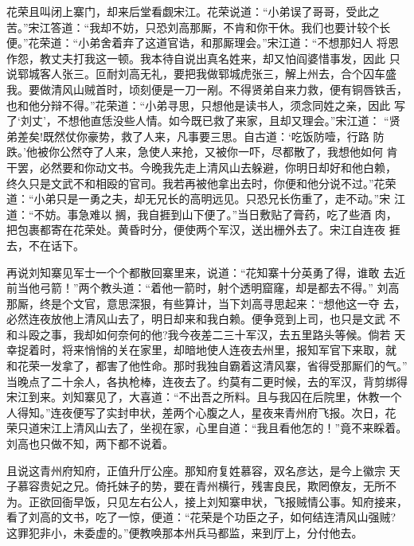 花荣且叫闭上寨门，却来后堂看觑宋江。花荣说道：“小弟误了哥哥，受此之
苦。”宋江答道：“我却不妨，只恐刘高那厮，不肯和你干休。我们也要计较个长
便。”花荣道：“小弟舍着弃了这道官诰，和那厮理会。”宋江道：“不想那妇人
将恩作怨，教丈夫打我这一顿。我本待自说出真名姓来，却又怕阎婆惜事发，因此
只说郓城客人张三。叵耐刘高无礼，要把我做郓城虎张三，解上州去，合个囚车盛
我。要做清风山贼首时，顷刻便是一刀一剐。不得贤弟自来力救，便有铜唇铁舌，
也和他分辩不得。”花荣道：“小弟寻思，只想他是读书人，须念同姓之亲，因此
写了‘刘丈’，不想他直恁没些人情。如今既已救了来家，且却又理会。”宋江道：
“贤弟差矣!既然仗你豪势，救了人来，凡事要三思。自古道：‘吃饭防噎，行路
防跌。’他被你公然夺了人来，急使人来抢，又被你一吓，尽都散了，我想他如何
肯干罢，必然要和你动文书。今晚我先走上清风山去躲避，你明日却好和他白赖，
终久只是文武不和相殴的官司。我若再被他拿出去时，你便和他分说不过。”花荣
道：“小弟只是一勇之夫，却无兄长的高明远见。只恐兄长伤重了，走不动。”宋
江道：“不妨。事急难以搁，我自捱到山下便了。”当日敷贴了膏药，吃了些酒
肉，把包裹都寄在花荣处。黄昏时分，便使两个军汉，送出栅外去了。宋江自连夜
捱去，不在话下。

再说刘知寨见军士一个个都散回寨里来，说道：“花知寨十分英勇了得，谁敢
去近前当他弓箭！”两个教头道：“着他一箭时，射个透明窟窿，却是都去不得。”
刘高那厮，终是个文官，意思深狠，有些算计，当下刘高寻思起来：“想他这一夺
去，必然连夜放他上清风山去了，明日却来和我白赖。便争竞到上司，也只是文武
不和斗殴之事，我却如何奈何的他?我今夜差二三十军汉，去五里路头等候。倘若
天幸捉着时，将来悄悄的关在家里，却暗地使人连夜去州里，报知军官下来取，就
和花荣一发拿了，都害了他性命。那时我独自霸着这清风寨，省得受那厮们的气。”
当晚点了二十余人，各执枪棒，连夜去了。约莫有二更时候，去的军汉，背剪绑得
宋江到来。刘知寨见了，大喜道：“不出吾之所料。且与我囚在后院里，休教一个
人得知。”连夜便写了实封申状，差两个心腹之人，星夜来青州府飞报。次日，花
荣只道宋江上清风山去了，坐视在家，心里自道：“我且看他怎的！”竟不来睬着。
刘高也只做不知，两下都不说着。

且说这青州府知府，正值升厅公座。那知府复姓慕容，双名彦达，是今上徽宗
天子慕容贵妃之兄。倚托妹子的势，要在青州横行，残害良民，欺罔僚友，无所不
为。正欲回衙早饭，只见左右公人，接上刘知寨申状，飞报贼情公事。知府接来，
看了刘高的文书，吃了一惊，便道：“花荣是个功臣之子，如何结连清风山强贼?
这罪犯非小，未委虚的。”便教唤那本州兵马都监，来到厅上，分付他去。

